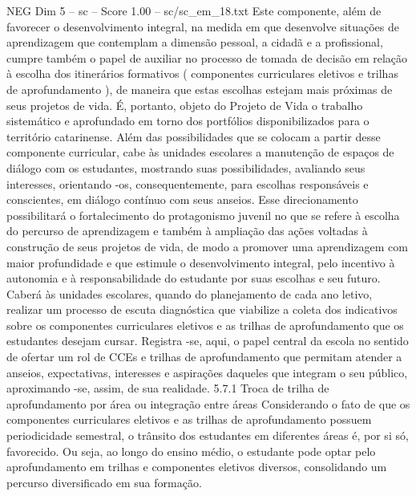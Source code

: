 \begin{textsample}{NEG Dim 5 – sc – Score 1.00 – sc/sc\_em\_18.txt}
Este componente, além de favorecer o desenvolvimento integral, na medida em que desenvolve situações de aprendizagem que contemplam a dimensão pessoal, a cidadã e a profissional, cumpre também o papel de auxiliar no processo de tomada de decisão em relação à escolha dos itinerários formativos ( componentes curriculares eletivos e trilhas de aprofundamento ), de maneira que estas escolhas estejam mais próximas de seus projetos de vida.
É, portanto, objeto do Projeto de Vida o trabalho sistemático e aprofundado em torno dos portfólios disponibilizados para o território catarinense.
Além das possibilidades que se colocam a partir desse componente curricular, cabe às unidades escolares a manutenção de espaços de diálogo com os estudantes, mostrando suas possibilidades, avaliando seus interesses, orientando -os, consequentemente, para escolhas responsáveis e conscientes, em diálogo contínuo com seus anseios.
Esse direcionamento possibilitará o fortalecimento do protagonismo juvenil no que se refere à escolha do percurso de aprendizagem e também à ampliação das ações voltadas à construção de seus projetos de vida, de modo a promover uma aprendizagem com maior profundidade e que estimule o desenvolvimento integral, pelo incentivo à autonomia e à responsabilidade do estudante por suas escolhas e seu futuro.
Caberá às unidades escolares, quando do planejamento de cada ano letivo, realizar um processo de escuta diagnóstica que viabilize a coleta dos indicativos sobre os componentes curriculares eletivos e as trilhas de aprofundamento que os estudantes desejam cursar.
Registra -se, aqui, o papel central da escola no sentido de ofertar um rol de CCEs e trilhas de aprofundamento que permitam atender a anseios, expectativas, interesses e aspirações daqueles que integram o seu público, aproximando -se, assim, de sua realidade. 5.7.1 Troca de trilha de aprofundamento por área ou integração entre áreas Considerando o fato de que os componentes curriculares eletivos e as trilhas de aprofundamento possuem periodicidade semestral, o trânsito dos estudantes em diferentes áreas é, por si só, favorecido.
Ou seja, ao longo do ensino médio, o estudante pode optar pelo aprofundamento em trilhas e componentes eletivos diversos, consolidando um percurso diversificado em sua formação.

\end{textsample}
